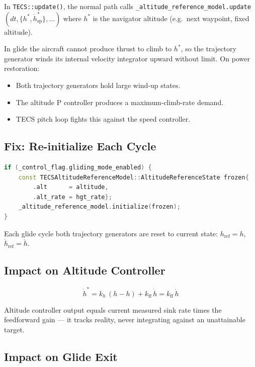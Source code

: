\documentclass[12pt,a4paper]{article}
\begin{document}
In \texttt{TECS::update()}, the normal path calls
\texttt{\_altitude\_reference\_model.update}$(dt,\{h^*,\dot{h}^*_{\text{sp}}\},\ldots)$
where $h^*$ is the navigator altitude (e.g.\ next waypoint, fixed altitude).

In glide the aircraft cannot produce thrust to climb to $h^*$, so the
trajectory generator winds its internal velocity integrator upward without
limit. On power restoration:
\begin{itemize}
  \item Both trajectory generators hold large wind-up states.
  \item The altitude P controller produces a maximum-climb-rate demand.
  \item TECS pitch loop fights this against the speed controller.
\end{itemize}

\subsection{Fix: Re-initialize Each Cycle}

\begin{lstlisting}[language=C++]
if (_control_flag.gliding_mode_enabled) {
    const TECSAltitudeReferenceModel::AltitudeReferenceState frozen{
        .alt      = altitude,
        .alt_rate = hgt_rate};
    _altitude_reference_model.initialize(frozen);
}
\end{lstlisting}

Each glide cycle both trajectory generators are reset to current state:
$h_{\text{ref}} = h$, $\dot{h}_{\text{ref}} = \dot{h}$.

\subsection{Impact on Altitude Controller}

\begin{equation}
  \dot{h}^* = k_h\,(h - h) + k_{\text{ff}}\,\dot{h} = k_{\text{ff}}\,\dot{h}
\end{equation}

Altitude controller output equals current measured sink rate times the
feedforward gain --- it tracks reality, never integrating against an
unattainable target.

\subsection{Impact on Glide Exit}
\end{document}
